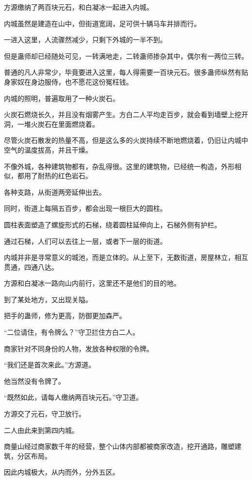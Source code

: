 
\begin{this_body}

方源缴纳了两百块元石，和白凝冰一起进入内城。

内城虽然是建造在山中，但街道宽阔，足可供十辆马车并排而行。

一进入这里，人流骤然减少，只剩下外城的一半不到。

但是蛊师却已经随处可见，一转满地走，二转蛊师掺杂其中，偶尔有一两位三转。

普通的凡人非常少，毕竟要进入这里，每人得需要一百块元石。很多蛊师纵然有贴身家奴在身边服侍，也不愿花这份冤枉钱。

内城的照明，普遍取用了一种火炭石。

火炭石燃烧长久，并且没有烟雾产生。方白二人平均走百步，就会看到墙壁上挖开洞，一堆火炭石在里面燃烧着。

尽管火炭石散发的热量不高，但是这么多的火炭持续不断地燃烧着，仍旧让内城中空气的温度拔高，并且干燥。

不像外城，各种建筑物都有，杂乱得很。这里的建筑物，已经统一构造，外形相似，都用了耐热的红色岩石。

各种支路，从街道两旁延伸出去。

同时，街道上每隔五百步，都会出现一根巨大的圆柱。

圆柱表面塑造了螺旋形式的石梯，绕着圆柱延伸向上，石梯外侧有护栏。

通过石梯，人们可以去往上一层，或者下一层的街道。

内城并非是寻常意义的城池，而是立体的。从上至下，无数街道，房屋林立，相互贯通，四通八达。

方源和白凝冰一路向山内前行，这里还不是他们的目的地。

到了某处地方，又出现关隘。

把手的蛊师，修为更高，防御更加森严。

“二位请住，有令牌么？”守卫拦住方白二人。

商家针对不同身份的人物，发放各种权限的令牌。

“我们还是首次来此。”方源道。

他当然没有令牌了。

“既然如此，请每人缴纳两百块元石。”守卫道。

方源交了元石，守卫放行。

二人由此来到第四内城。

商量山经过商家数千年的经营，整个山体内部都被商家改造，挖开通路，雕塑建筑，分区布局。

因此内城极大，从内而外，分外五区。


\end{this_body}
